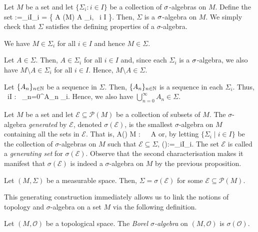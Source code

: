 \bp
Let $M$ be a set and let $\{ \Sigma_i : i \in I\}$ be a collection of $\sigma$-algebras on $M$. Define the set
\bse
\Sigma :=\bigcap_{i\in I}\Sigma_i = \{ A \in {}(M) \mid A \in \Sigma_i, \forall \, i \in I \}.
\ese
Then, $\Sigma$ is a $\sigma$-algebra on $M$.
\ep
\bq
We simply check that $\Sigma$ satisfies the defining properties of a $\sigma$-algebra.
\ben[label=(\roman*)]
\item We have $M \in \Sigma_i$ for all $i \in I$ and hence $ M \in \Sigma$.  
\item Let $A \in \Sigma$. Then, $A \in \Sigma_i$ for all $i \in I$
and, since each $\Sigma_i$ is a $\sigma$-algebra, we also have $M\setminus A \in \Sigma_i$ for all $i\in I$. Hence, $M\setminus A \in \Sigma$.
\item Let $\{A_n\}_{n\in\mathbb{N}}$ be a sequence in $\Sigma$. Then, $\{A_n\}_{n\in\mathbb{N}}$ is a sequence in each $\Sigma_i$. Thus,
\bse
\forall \, i\in I : \ \bigcup_{n=0}^{\infty}{A_n} \in \Sigma_i.
\ese
Hence, we also have $\bigcup_{n=0}^{\infty}{A_n} \in \Sigma$. \qedhere
\een
\eq

\bd
Let $M$ be a set and let $\mathcal{E}\subseteq\mathscr{P}(M)$ be a collection of subsets of $M$. The $\sigma$-algebra \emph{generated} by $\mathcal{E}$, denoted $\sigma(\mathcal{E})$, is the smallest $\sigma$-algebra on $M$ containing all the sets in $\mathcal{E}$. That is,
\bse
A\in\sigma() \quad \Leftrightarrow \quad  {}\Sigma {} M :\ \subseteq \Sigma \, \Rightarrow\, A\in \Sigma
\ese
or, by letting $\{\Sigma_i\mid i\in I\}$ be the collection of $\sigma$-algebras on $M$ such that $\mathcal{E}\subseteq \Sigma$,
\bse
\sigma():=\bigcap_{i\in I}\Sigma_i.
\ese
\ed
The set $\mathcal{E}$ is called a \emph{generating set} for $\sigma(\mathcal{E})$. Observe that the second characterisation makes it manifest that $\sigma(\mathcal{E})$ is indeed a $\sigma$-algebra on $M$ by the previous proposition.

\bt
Let $(M,\Sigma)$ be a measurable space. Then, $\Sigma=\sigma(\mathcal{E})$ for some $\mathcal{E}\subseteq\mathscr{P}(M)$.
\et

This generating construction immediately allows us to link the notions of topology and $\sigma$-algebra on a set $M$ via the following definition.

\bd
Let $(M,\mathcal{O})$ be a topological space. The \emph{Borel $\sigma$-algebra} on $(M,\mathcal{O})$ is $\sigma(\mathcal{O})$. 
\ed

